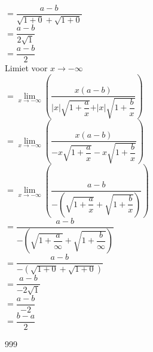 \documentclass[a4paper]{article}
\begin{document}
$= \dfrac{a - b}{\sqrt{1 + 0} + \sqrt{1 + 0}}$ \\

$= \dfrac{a - b}{2\sqrt{1}}$ \\

$= \dfrac{a - b}{2}$ \\

Limiet voor $x \rightarrow -\infty$ \\

$= \lim\limits_{x \rightarrow -\infty} \left(\dfrac{x(a - b)}{\vert x \vert \sqrt{1 + \dfrac{a}{x}} + \vert x \vert \sqrt{1 + \dfrac{b}{x}}}\right)$ \\

$= \lim\limits_{x \rightarrow -\infty} \left(\dfrac{x(a - b)}{-x\sqrt{1 + \dfrac{a}{x}} - x\sqrt{1 + \dfrac{b}{x}}}\right)$ \\

$= \lim\limits_{x \rightarrow -\infty} \left(\dfrac{a - b}{- \left(\sqrt{1 + \dfrac{a}{x}} + \sqrt{1 + \dfrac{b}{x}}\right)}\right)$ \\

$= \dfrac{a - b}{- \left(\sqrt{1 + \dfrac{a}{\infty}} + \sqrt{1 + \dfrac{b}{\infty}}\right)}$ \\

$= \dfrac{a - b}{- \left(\sqrt{1 + 0} + \sqrt{1 + 0}\right)}$ \\

$= \dfrac{a - b}{-2\sqrt{1}}$ \\

$= \dfrac{a - b}{-2}$ \\

$= \dfrac{b - a}{2}$

\begin{thebibliography}{999}
\end{thebibliography}
\end{document}
